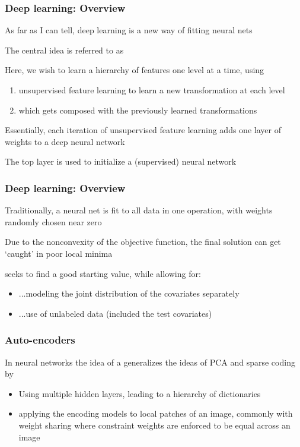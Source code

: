 \documentclass[12pt]{beamer}
\begin{document}
\begin{frame}[fragile]
\frametitle{Deep learning: Overview}
As far as I can tell, deep learning is a new way of fitting neural nets

\vsp
 The central idea is referred to as 
 
 \vsp
 Here, we wish to learn a hierarchy of features one level at a time, using 
 \begin{enumerate}
 \item  unsupervised feature learning to learn a new transformation at each level
 \item which gets composed with the previously learned transformations
 \end{enumerate}
 
 \vsp
Essentially, each iteration of unsupervised feature learning adds one layer of weights to a deep neural network

\vsp
The top layer is used to initialize a  (supervised) neural network 


\end{frame}

\begin{frame}[fragile]
\frametitle{Deep learning: Overview}


\vsp
Traditionally, a neural net is fit to all  data in one operation, with weights
randomly chosen near zero

\vsp
Due to the nonconvexity of the objective function, the final solution can get `caught' in poor local minima

\vsp
{} seeks to find a good starting value, while allowing for:

\begin{itemize}
\item  ...modeling the joint distribution of the covariates separately
\item  ...use of unlabeled data (included the test covariates)
\end{itemize}

\end{frame}

\begin{frame}[fragile]
\frametitle{Auto-encoders}
In neural networks the idea of a  generalizes the ideas of PCA and sparse coding by
\begin{itemize}
\item Using multiple hidden layers, leading to a hierarchy of dictionaries

\item applying the encoding models to local patches of an image, commonly with weight sharing where
constraint weights are enforced to be equal across an image

\end{itemize}

\end{frame}
\end{document}
